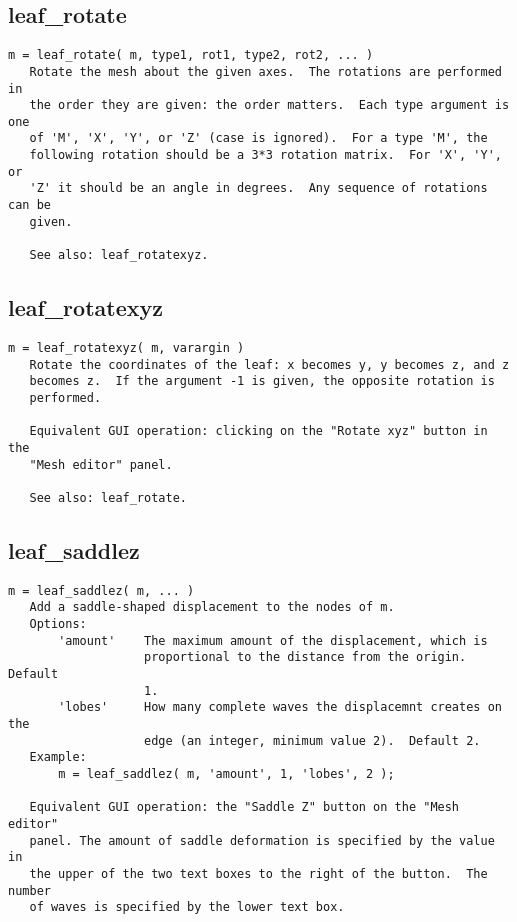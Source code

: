 \subsection{leaf\_rotate}\label{section-leaf-rotate}

\begin{verbatim}
m = leaf_rotate( m, type1, rot1, type2, rot2, ... )
   Rotate the mesh about the given axes.  The rotations are performed in
   the order they are given: the order matters.  Each type argument is one
   of 'M', 'X', 'Y', or 'Z' (case is ignored).  For a type 'M', the
   following rotation should be a 3*3 rotation matrix.  For 'X', 'Y', or
   'Z' it should be an angle in degrees.  Any sequence of rotations can be
   given.

   See also: leaf_rotatexyz.
\end{verbatim}

\subsection{leaf\_rotatexyz}\label{section-leaf-rotatexyz}

\begin{verbatim}
m = leaf_rotatexyz( m, varargin )
   Rotate the coordinates of the leaf: x becomes y, y becomes z, and z
   becomes z.  If the argument -1 is given, the opposite rotation is
   performed.

   Equivalent GUI operation: clicking on the "Rotate xyz" button in the
   "Mesh editor" panel.

   See also: leaf_rotate.
\end{verbatim}

\subsection{leaf\_saddlez}\label{section-leaf-saddlez}

\begin{verbatim}
m = leaf_saddlez( m, ... )
   Add a saddle-shaped displacement to the nodes of m.
   Options:
       'amount'    The maximum amount of the displacement, which is
                   proportional to the distance from the origin.  Default
                   1.
       'lobes'     How many complete waves the displacemnt creates on the
                   edge (an integer, minimum value 2).  Default 2.
   Example:
       m = leaf_saddlez( m, 'amount', 1, 'lobes', 2 );

   Equivalent GUI operation: the "Saddle Z" button on the "Mesh editor"
   panel. The amount of saddle deformation is specified by the value in
   the upper of the two text boxes to the right of the button.  The number
   of waves is specified by the lower text box.
\end{verbatim}


